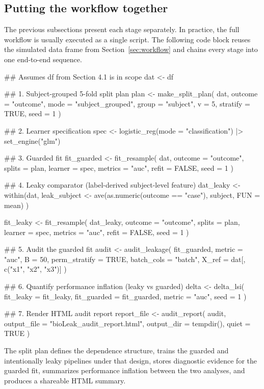 \documentclass[article,shortnames]{jss}
\begin{document}
\subsection{Putting the workflow together}

The previous subsections present each stage separately. In practice, the full
workflow is usually executed as a single script. The following code block
reuses the simulated data frame  from Section~\ref{sec:workflow} and
chains every stage into one end-to-end sequence.

\begin{CodeInput}
## Assumes df from Section 4.1 is in scope
dat <- df

## 1. Subject-grouped 5-fold split plan
plan <- make_split_plan(
  dat,
  outcome = "outcome",
  mode = "subject_grouped",
  group = "subject",
  v = 5,
  stratify = TRUE,
  seed = 1
)

## 2. Learner specification
spec <- logistic_reg(mode = "classification") |>
  set_engine("glm")

## 3. Guarded fit
fit_guarded <- fit_resample(
  dat,
  outcome = "outcome",
  splits = plan,
  learner = spec,
  metrics = "auc",
  refit = FALSE,
  seed = 1
)

## 4. Leaky comparator (label-derived subject-level feature)
dat_leaky <- within(dat, {
  leak_subject <- ave(as.numeric(outcome == "case"), subject, FUN = mean)
})

fit_leaky <- fit_resample(
  dat_leaky,
  outcome = "outcome",
  splits = plan,
  learner = spec,
  metrics = "auc",
  refit = FALSE,
  seed = 1
)

## 5. Audit the guarded fit
audit <- audit_leakage(
  fit_guarded,
  metric = "auc",
  B = 50,
  perm_stratify = TRUE,
  batch_cols = "batch",
  X_ref = dat[, c("x1", "x2", "x3")]
)

## 6. Quantify performance inflation (leaky vs guarded)
delta <- delta_lsi(
  fit_leaky = fit_leaky,
  fit_guarded = fit_guarded,
  metric = "auc",
  seed = 1
)

## 7. Render HTML audit report
report_file <- audit_report(
  audit,
  output_file = "bioLeak_audit_report.html",
  output_dir = tempdir(),
  quiet = TRUE
)
\end{CodeInput}

\noindent
The split plan defines the dependence structure,  trains the guarded and intentionally leaky pipelines under that design,  stores diagnostic evidence for the guarded fit,  summarizes performance inflation between the two analyses, and  produces a shareable HTML summary.
\end{document}
